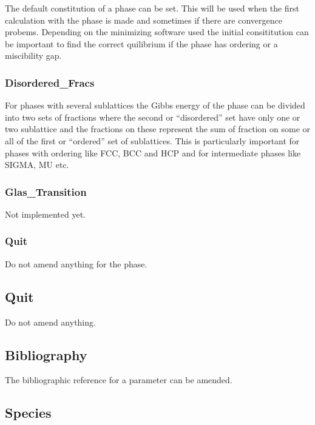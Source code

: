\documentclass[12pt]{article}
\begin{document}
The default constitution of a phase can be set.  This will be used
when the first calculation with the phase is made and sometimes if
there are convergence probems.  Depending on the minimizing software
used the initial consititution can be important to find the correct
quilibrium if the phase has ordering or a miscibility gap.

\subsubsection{Disordered\_Fracs}

For phases with several sublattices the Gibbs energy of the phase can
be divided into two sets of fractions where the second or
``disordered'' set have only one or two sublattice and the fractions
on these represent the sum of fraction on some or all of the first or
``ordered'' set of sublattices.  This is particularly important for
phases with ordering like FCC, BCC and HCP and for intermediate phases
like SIGMA, MU etc.

\subsubsection{Glas\_Transition}

Not implemented yet.

\subsubsection{Quit}

Do not amend anything for the phase.

\subsection{Quit}

Do not amend anything.

\subsection{Bibliography}

The bibliographic reference for a parameter can be amended.

\subsection{Species}
\end{document}
